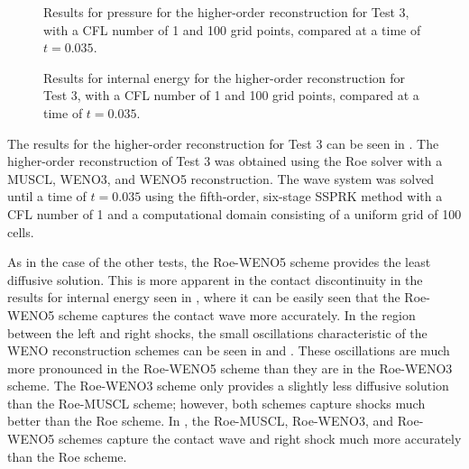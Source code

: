 \begin{figure}
	\caption[Results for pressure for the higher-order reconstruction for Test 3, with a CFL number of 1 and 100 grid points, compared at a time of $t=0.035$.]{Results for pressure for the higher-order reconstruction for Test 3, with a CFL number of 1 and 100 grid points, compared at a time of $t=0.035$.}
	\label{fig:Test4HORpressure}
\end{figure}

\begin{figure}
	\caption[Results for internal energy for the higher-order reconstruction for Test 3, with a CFL number of 1 and 100 grid points, compared at a time of $t=0.035$.]{Results for internal energy for the higher-order reconstruction for Test 3, with a CFL number of 1 and 100 grid points, compared at a time of $t=0.035$.}
	\label{fig:Test4HORenergy}
\end{figure}
The results for the higher-order reconstruction for Test 3 can be seen in . The higher-order reconstruction of Test 3 was obtained using the Roe solver with a MUSCL, WENO3, and WENO5 reconstruction. The wave system was solved until a time of $t=0.035$ using the fifth-order, six-stage SSPRK method with a CFL number of 1 and a computational domain consisting of a uniform grid of 100 cells.

As in the case of the other tests, the Roe-WENO5 scheme provides the least diffusive solution. This is more apparent in the contact discontinuity in the results for internal energy seen in , where it can be easily seen that the Roe-WENO5 scheme captures the contact wave more accurately. In the region between the left and right shocks, the small oscillations characteristic of the WENO reconstruction schemes can be seen in  and . These oscillations are much more pronounced in the Roe-WENO5 scheme than they are in the Roe-WENO3 scheme. The Roe-WENO3 scheme only provides a slightly less diffusive solution than the Roe-MUSCL scheme; however, both schemes capture shocks much better than the Roe scheme. In , the Roe-MUSCL, Roe-WENO3, and Roe-WENO5 schemes capture the contact wave and right shock much more accurately than the Roe scheme.


